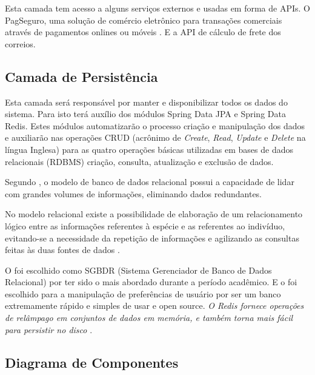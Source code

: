 \documentclass[a4paper,12pt]{monografia}
\begin{document}
Esta camada tem acesso a alguns serviços externos e usadas em forma de APIs. O PagSeguro, uma solução de comércio eletrônico para transações comerciais através de pagamentos onlines ou móveis \cite{pagseguro}. E a API de cálculo de frete dos correios.


\subsection{Camada de Persistência} %
\label{sub:camada_de_persistencia}

Esta camada será responsável por manter e disponibilizar todos os dados do sistema. Para isto terá auxílio dos módulos Spring Data JPA e Spring Data Redis. Estes módulos automatizarão o processo criação e manipulação dos dados e auxiliarão  nas operações CRUD (acrônimo de \textit{Create}, \textit{Read}, \textit{Update} e \textit{Delete} na língua Inglesa) para as quatro operações básicas utilizadas em bases de dados relacionais (RDBMS) criação, consulta, atualização e exclusão de dados.

Segundo , o modelo de banco de dados relacional possui a capacidade de lidar com grandes volumes de informações, eliminando dados redundantes. 

\begin{citacao}
	No modelo relacional existe a possibilidade de elaboração de um relacionamento lógico entre as informações referentes à espécie e as referentes ao indivíduo, evitando-se a necessidade da repetição de informações e agilizando as consultas feitas às duas fontes de dados \cite{da2002banco}.
\end{citacao}

O  foi escolhido como SGBDR (Sistema Gerenciador de Banco de Dados Relacional) por ter sido o mais abordado durante a período acadêmico. E o  foi escolhido para a manipulação de preferências de usuário por ser um banco extremamente rápido e simples de usar e open source. \textit{O Redis fornece operações de relâmpago em conjuntos de dados em memória, e também torna mais fácil para persistir no disco} \cite{Carlson:2013:RA:2505464}.



\subsection{Diagrama de Componentes} %
\label{sub:diagrama_de_componentes}
\end{document}
